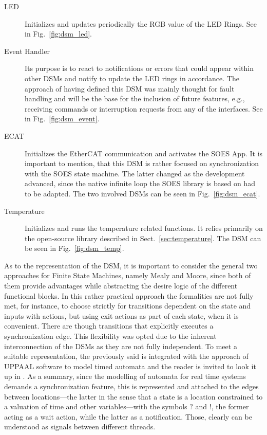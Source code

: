 \begin{description}
\item[LED] Initializes and updates periodically the RGB value of the LED Rings. See in Fig.~\ref{fig:dsm_led}.
\item[Event Handler] Its purpose is to react to notifications or errors that could appear within other DSMs and notify to update the LED rings in accordance.
                    The approach of having defined this DSM was mainly thought for fault handling and will be the base for the inclusion of future features, e.g.,
                    receiving commands or interruption requests from any of the interfaces. See in Fig.~\ref{fig:dsm_event}.
\item[ECAT] Initializes the EtherCAT communication and activates the SOES App. It is important to mention, that this DSM is rather focused on synchronization 
            with the SOES state machine. The latter changed as the development advanced, since the native infinite loop the SOES library is based on had to be adapted.
            The two involved DSMs can be seen in Fig.~\ref{fig:dsm_ecat}.
\item[Temperature] Initializes and runs the temperature related functions. It relies primarily on the open-source library described in Sect.~\ref{sec:temperature}. 
            The DSM can be seen in Fig.~\ref{fig:dsm_temp}.

\end{description}

As to the representation of the DSM, it is important to consider the general two approaches for Finite State Machines, namely Mealy and Moore, since both 
of them provide advantages while abstracting the desire logic of the different functional blocks. In this rather practical approach the formalities are not fully
met, for instance, to choose strictly for transitions dependent on the state and inputs with actions, but using exit actions as part of each state, when it is convenient.
There are though transitions that explicitly executes a synchronization edge. This flexibility was opted due to the inherent interconnection of the DSMs
as they are not fully independent. To meet a suitable representation, the previously said is integrated with the approach of UPPAAL 
software to model timed automata and the reader is invited to look it up in \cite{uppaal_tutorial}.
As a summary, since the modelling of automata for real time systems demands a synchronization feature, this is represented and attached to the edges between 
locations---the latter in the sense that a state is a location constrained to a valuation of time and other variables---with the symbols $?$ and $!$, the former acting as 
a wait action, while the latter as a notification. Those, clearly can be understood as signals between different threads.


